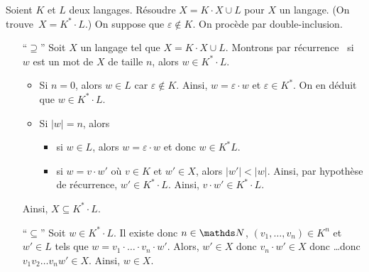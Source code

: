 \documentclass[a4paper]{article}
\begin{document}
	\begin{exm}
		Soient $K$ et $L$ deux langages. Résoudre $X = K\cdot X \cup L$ pour $X$ un langage.
		(On trouve~$X = K^* \cdot L$.) On suppose que $\varepsilon \not\in K$.
		On procède par double-inclusion.
		\begin{itemize}
			\item[``$\supseteq$''] Soit $X$ un langage tel que $X = K\cdot X \cup L$.
				Montrons par récurrence \guillemotleft~si $w$ est un mot de $X$ de taille $n$, alors $w \in K^* \cdot L$.
				\begin{itemize}
					\item Si $n= 0$, alors $w \in L$ car $\varepsilon \not\in  K$.
						Ainsi, $w = \varepsilon \cdot w$ et $\varepsilon \in K^*$. On en déduit que $w \in K^* \cdot L$.
					\item Si $|w| = n$, alors
						\begin{itemize}
							\item si $w \in L$, alors $w = \varepsilon \cdot w$ et donc $w \in K^* L$.
							\item si $w = v \cdot w'$ où $v \in K$ et $w' \in X$, alors $|w'| < |w|$. Ainsi, par hypothèse de récurrence, $w' \in K^* \cdot L$. Ainsi, $v \cdot w' \in K^* \cdot L$.
						\end{itemize}
				\end{itemize}
				Ainsi, $X \subseteq K^* \cdot L$.
			\item[``$\subseteq$'']
				Soit $w \in K^* \cdot L$. Il existe donc $n \in \N$, $(v_1, \ldots, v_n) \in K^n$ et $w' \in L$ tels que $w = v_1 \cdot \ldots \cdot v_n \cdot  w'$.
				Alors, $w' \in X$ donc $v_n \cdot w' \in X$ donc \ldots donc $v_1 v_2 \ldots v_n w' \in X$.
				Ainsi, $w \in X$.
		\end{itemize}
	\end{exm}
\end{document}
